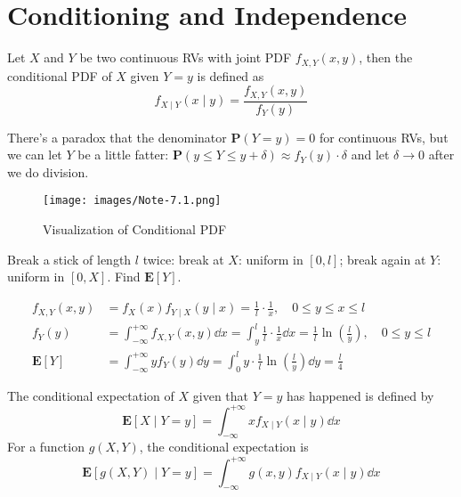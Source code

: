 \section{Conditioning and Independence}

\begin{definition}
    Let $X$ and $Y$ be two continuous RVs with joint PDF $f_{X, Y}(x, y)$, then the conditional PDF of $X$ given $Y = y$ is defined as
    \begin{equation}
        f_{X \mid Y}(x \mid y) = \frac{f_{X, Y}(x, y)}{f_{Y}(y)}
    \end{equation}
\end{definition}

\begin{remark}
    There's a paradox that the denominator $\mathbf{P}(Y = y) = 0$ for continuous RVs, but we can let $Y$ be a little fatter: $\mathbf{P}(y \leq Y \leq y + \delta) \approx f_{Y}(y) \cdot \delta$ and let $\delta \to 0$ after we do division.
\end{remark}

\begin{figure}[H]
    \centering
    \texttt{[image: images/Note-7.1.png]}
    \caption{Visualization of Conditional PDF}
\end{figure}

\begin{example}
    \label{ex:stick-breaking}
    Break a stick of length $l$ twice: break at $X$: uniform in $[0, l]$; break again at $Y$: uniform in $[0, X]$. Find $\mathbf{E}[Y]$. 
    \begin{solution}
        \begin{align}
            f_{X, Y}(x, y) &= f_{X}(x) f_{Y \mid X}(y \mid x) = \frac{1}{l} \cdot \frac{1}{x}, \quad 0 \leq y \leq x \leq l \\ 
            f_{Y}(y) &= \int_{-\infty}^{+\infty} f_{X, Y}(x, y) \dd{x} = \int_{y}^{l} \frac{1}{l} \cdot \frac{1}{x} \dd{x} = \frac{1}{l} \ln\left(\frac{l}{y}\right), \quad 0 \leq y \leq l \\ 
            \mathbf{E}[Y] &= \int_{-\infty}^{+\infty} y f_{Y}(y) \dd{y} = \int_{0}^{l} y \cdot \frac{1}{l} \ln\left(\frac{l}{y}\right) \dd{y} = \frac{l}{4}
        \end{align}
    \end{solution}
\end{example}

\begin{definition}
    The conditional expectation of $X$ given that $Y = y$ has happened is defined by
    \begin{equation}
        \mathbf{E}[X \mid Y = y] = \int_{-\infty}^{+\infty} x f_{X \mid Y}(x \mid y) \dd{x}
    \end{equation}
    For a function $g(X, Y)$, the conditional expectation is 
    \begin{equation}
        \mathbf{E}[g(X, Y) \mid Y = y] = \int_{-\infty}^{+\infty} g(x, y) f_{X \mid Y}(x \mid y) \dd{x}
    \end{equation}
\end{definition}

